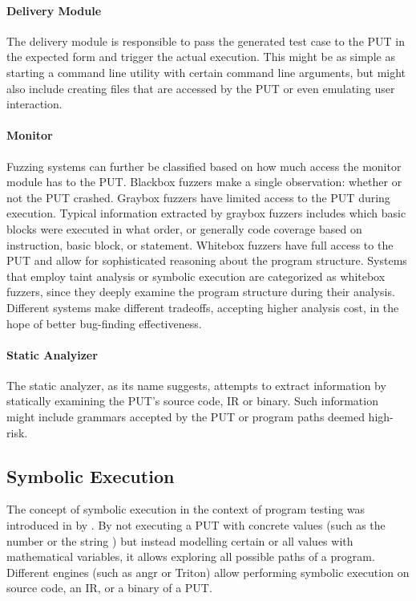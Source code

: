 \documentclass{article}
\begin{document}
\begin{multicols}{2}
    \paragraph{Delivery Module}
    The delivery module is responsible to pass the generated test case to the PUT in the expected form and trigger the actual execution. This might be as simple as starting a command line utility with certain command line arguments, but might also include creating files that are accessed by the PUT or even emulating user interaction.

    \paragraph{Monitor}
    Fuzzing systems can further be classified based on how much access the monitor module has to the PUT. Blackbox fuzzers make a single observation: whether or not the PUT crashed. Graybox fuzzers have limited access to the PUT during execution. Typical information extracted by graybox fuzzers includes which basic blocks were executed in what order, or generally code coverage based on instruction, basic block, or statement. Whitebox fuzzers have full access to the PUT and allow for sophisticated reasoning about the program structure. Systems that employ taint analysis or symbolic execution are categorized as whitebox fuzzers, since they deeply examine the program structure during their analysis. Different systems make different tradeoffs, accepting higher analysis cost, in the hope of better bug-finding effectiveness.\cite{EvaluatingFuzzTesting}

    \paragraph{Static Analyizer}
    The static analyzer, as its name suggests, attempts to extract information by statically examining the PUT's source code, IR or binary. Such information might include grammars accepted by the PUT or program paths deemed high-risk.

    \subsection{Symbolic Execution}
    The concept of symbolic execution in the context of program testing was introduced in \citeyear{Symbex} by \citeauthor{Symbex}.\cite{Symbex} By not executing a PUT with concrete values (such as the number  or the string ) but instead modelling certain or all values with mathematical variables, it allows exploring all possible paths of a program. Different engines (such as angr\cite{angr} or Triton\cite{Triton}) allow performing symbolic execution on source code, an IR, or a binary of a PUT.


\end{multicols}
\end{document}
